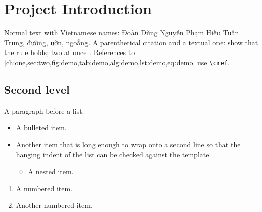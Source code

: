 \documentclass[a4paper,romanchapters,chapterbreak]{fptthesis}
\begin{document}
\frontmatter
\TableOfContents
\ListOfTables
\ListOfFigures
\mainmatter
\chapter{Project Introduction}\label{ch:one}
Normal text with Vietnamese names: Đoàn Dũng Nguyễn Phạm Hiếu Tuấn Trung, đường, ưỡn, ngoẵng. A parenthetical citation \parencite{leeder} and a textual one: \textcite{madden} show that the rule holds; two at once \parencite{comfort,byrne}. References to \cref{ch:one,sec:two,fig:demo,tab:demo,alg:demo,lst:demo,eq:demo} use \texttt{\textbackslash cref}.
\section{Second level}\label{sec:two}
A paragraph before a list.
\begin{itemize}
\item A bulleted item.
\item Another item that is long enough to wrap onto a second line so that the hanging indent of the list can be checked against the template.
  \begin{itemize}
  \item A nested item.
  \end{itemize}
\end{itemize}
\begin{enumerate}
\item A numbered item.
\item Another numbered item.
\end{enumerate}
\end{document}
